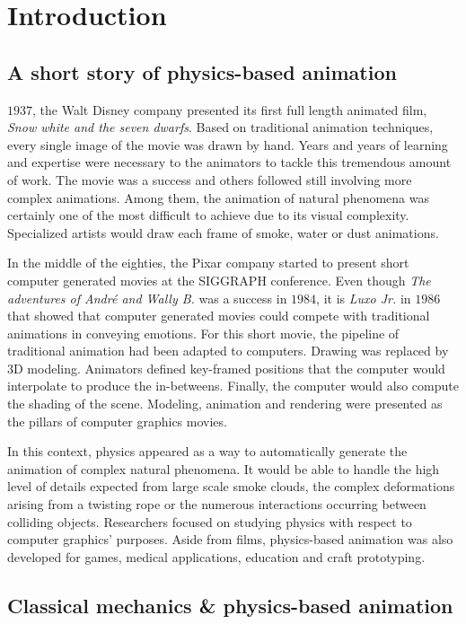 \chapter[Introduction]{Introduction}
\label{chap:introduction}

\section{A short story of physics-based animation}
 $1937$, the Walt Disney company presented its first full length animated film, \emph{Snow white and the seven dwarfs}. Based on traditional animation techniques, every single image of the movie was drawn by hand. Years and years of learning and expertise were necessary to the animators to tackle this tremendous amount of work. The movie was a success and others followed still involving more complex animations. Among them, the animation of natural phenomena was certainly one of the most difficult to achieve due to its visual complexity. Specialized artists would draw each frame of smoke, water or dust animations.

In the middle of the eighties, the Pixar company started to present short computer generated movies at the SIGGRAPH conference. Even though \emph{The adventures of André and Wally B.} was a success in $1984$, it is \emph{Luxo Jr.} in $1986$ that showed that computer generated movies could compete with traditional animations in conveying emotions. For this short movie, the pipeline of traditional animation had been adapted to computers. Drawing was replaced by 3D modeling. Animators defined key-framed positions that the computer would interpolate to produce the in-betweens. Finally, the computer would also compute the shading of the scene. Modeling, animation and rendering were presented as the pillars of computer graphics movies.

In this context, physics appeared as a way to automatically generate the animation of complex natural phenomena. It would be able to handle the high level of details expected from large scale smoke clouds, the complex deformations arising from a twisting rope or the numerous interactions occurring between colliding objects. Researchers focused on studying physics with respect to computer graphics' purposes. Aside from films, physics-based animation was also developed for games, medical applications, education and craft prototyping.

\section{Classical mechanics \& physics-based animation}

